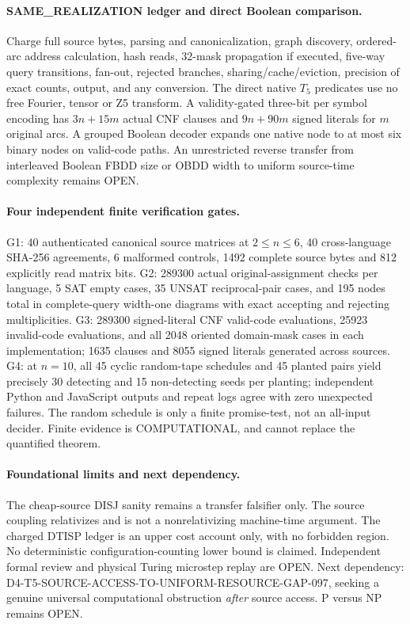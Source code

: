 \documentclass[11pt]{article}
\begin{document}
\paragraph{SAME\_REALIZATION ledger and direct Boolean comparison.}
Charge full source bytes, parsing and canonicalization,
graph discovery, ordered-arc address calculation, hash reads,
32-mask propagation if executed, five-way query transitions,
fan-out, rejected branches, sharing/cache/eviction, precision
of exact counts, output, and any conversion. The direct native
$T_5$ predicates use no free Fourier, tensor or Z5 transform.
A validity-gated three-bit per symbol encoding has
$3n+15m$ actual CNF clauses and $9n+90m$ signed literals
for $m$ original arcs. A grouped Boolean decoder expands
one native node to at most six binary nodes on valid-code
paths. An unrestricted reverse transfer from interleaved
Boolean FBDD size or OBDD width to uniform source-time
complexity remains OPEN.

\paragraph{Four independent finite verification gates.}
G1: 40 authenticated canonical source matrices at $2\le n\le6$,
40 cross-language SHA-256 agreements, 6 malformed controls,
1492 complete source bytes and 812 explicitly read matrix bits.
G2: 289300 actual original-assignment checks per language,
5 SAT empty cases, 35 UNSAT reciprocal-pair cases, and
195 nodes total in complete-query width-one diagrams with
exact accepting and rejecting multiplicities.
G3: 289300 signed-literal CNF valid-code evaluations,
25923 invalid-code evaluations, and all 2048 oriented
domain-mask cases in each implementation; 1635 clauses
and 8055 signed literals generated across sources.
G4: at $n=10$, all 45 cyclic random-tape schedules and
45 planted pairs yield precisely 30 detecting and 15
non-detecting seeds per planting; independent Python and
JavaScript outputs and repeat logs agree with zero
unexpected failures. The random schedule is only a
finite promise-test, not an all-input decider.
Finite evidence is COMPUTATIONAL, and cannot replace the
quantified theorem.

\paragraph{Foundational limits and next dependency.}
The cheap-source DISJ sanity remains a transfer falsifier only.
The source coupling relativizes and is not a nonrelativizing
machine-time argument. The charged DTISP ledger is an upper
cost account only, with no forbidden region. No deterministic
configuration-counting lower bound is claimed. Independent
formal review and physical Turing microstep replay are OPEN.
Next dependency: D4-T5-SOURCE-ACCESS-TO-UNIFORM-RESOURCE-GAP-097,
seeking a genuine universal computational obstruction \emph{after}
source access. P versus NP remains OPEN.
\end{document}
